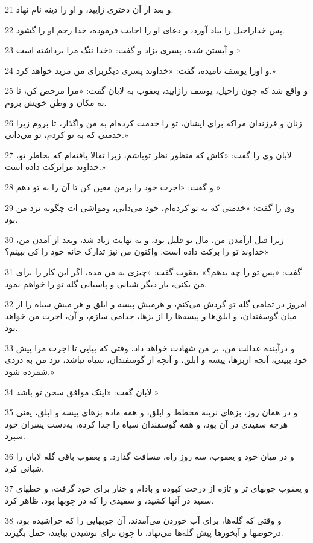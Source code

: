 \par 21 و بعد از آن دختری زایید، و او را دینه نام نهاد.
\par 22 پس خداراحیل را بیاد آورد، و دعای او را اجابت فرموده، خدا رحم او را گشود.
\par 23 و آبستن شده، پسری بزاد و گفت: «خدا ننگ مرا برداشته است.»
\par 24 و اورا یوسف نامیده، گفت: «خداوند پسری دیگربرای من مزید خواهد کرد.»
\par 25 و واقع شد که چون راحیل، یوسف رازایید، یعقوب به لابان گفت: «مرا مرخص کن، تا به مکان و وطن خویش بروم.
\par 26 زنان و فرزندان مراکه برای ایشان، تو را خدمت کرده‌ام به من واگذار، تا بروم زیرا خدمتی که به تو کردم، تو می‌دانی.»
\par 27 لابان وی را گفت: «کاش که منظور نظر توباشم، زیرا تفالا یافته‌ام که بخاطر تو، خداوند مرابرکت داده است.»
\par 28 و گفت: «اجرت خود را برمن معین کن تا آن را به تو دهم.»
\par 29 وی را گفت: «خدمتی که به تو کرده‌ام، خود می‌دانی، ومواشی ات چگونه نزد من بود.
\par 30 زیرا قبل ازآمدن من، مال تو قلیل بود، و به نهایت زیاد شد، وبعد از آمدن من، خداوند تو را برکت داده است. واکنون من نیز تدارک خانه خود را کی ببینم؟»
\par 31 گفت: «پس تو را چه بدهم؟» یعقوب گفت: «چیزی به من مده، اگر این کار را برای من بکنی، بار دیگر شبانی و پاسبانی گله تو را خواهم نمود.
\par 32 امروز در تمامی گله تو گردش می‌کنم، و هرمیش پیسه و ابلق و هر میش سیاه را از میان گوسفندان، و ابلق‌ها و پیسه‌ها را از بزها، جدامی سازم، و آن، اجرت من خواهد بود.
\par 33 و درآینده عدالت من، بر من شهادت خواهد داد، وقتی که بیایی تا اجرت مرا پیش خود ببینی، آنچه ازبزها، پیسه و ابلق، و آنچه از گوسفندان، سیاه نباشد، نزد من به دزدی شمرده شود.»
\par 34 لابان گفت: «اینک موافق سخن تو باشد.»
\par 35 و در همان روز، بزهای نرینه مخطط و ابلق، و همه ماده بزهای پیسه و ابلق، یعنی هر‌چه سفیدی در آن بود، و همه گوسفندان سیاه را جدا کرده، به‌دست پسران خود سپرد.
\par 36 و در میان خود و یعقوب، سه روز راه، مسافت گذارد. و یعقوب باقی گله لابان را شبانی کرد.
\par 37 و یعقوب چوبهای تر و تازه از درخت کبوده و بادام و چنار برای خود گرفت، و خطهای سفید در آنها کشید، و سفیدی را که در چوبها بود، ظاهر کرد.
\par 38 و وقتی که گله‌ها، برای آب خوردن می‌آمدند، آن چوبهایی را که خراشیده بود، درحوضها و آبخورها پیش گله‌ها می‌نهاد، تا چون برای نوشیدن بیایند، حمل بگیرند.
